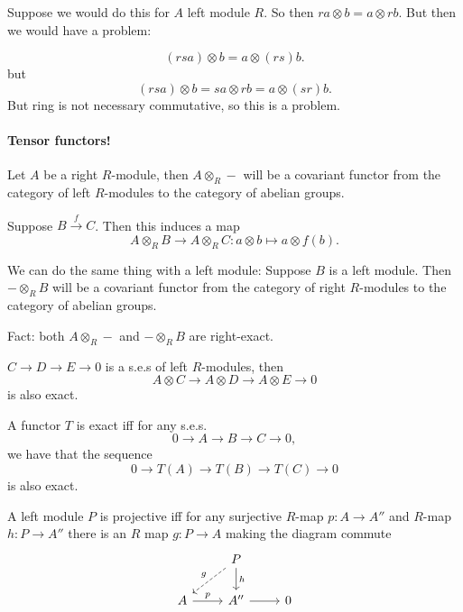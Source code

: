 Suppose we  would do this for $A$ left module $R$.
So then $ ra \otimes b = a \otimes rb .$ 
But then we would have a problem:

\[
    (r s a) \otimes b = a \otimes (rs)b
.\] 
but
\[
    (rsa) \otimes b = s a \otimes rb = a \otimes (sr) b
.\] 
But ring is not necessary commutative, so this is a problem.

\paragraph{Tensor functors!}

Let $A$ be a right $R$-module, then $A \otimes_R -$ will be a covariant functor from the category of left $R$-modules to the category of abelian groups.

Suppose $B \xrightarrow{f}  C$.
Then this induces a map 
\[
    A \otimes_R B \to  A \otimes_R C: a \otimes b \mapsto  a \otimes f(b)
.\] 

We can do the same thing with a left module:
Suppose $B$ is a left module.
Then $- \otimes_R B$ will be a covariant functor from the category of right $R$-modules to the category of abelian groups.

\begin{prop}
    Fact: both $A \otimes_R -$ and $- \otimes_R B$ are right-exact.
    \begin{eg}
        $C \to  D \to  E \to  0$ is a s.e.s of left $R$-modules, then
        \[
        A \otimes C \to  A\otimes D \to  A\otimes E \to  0
        \] 
        is also exact.
    \end{eg}
\end{prop}

\begin{definition}
    A functor $T$ is exact iff for any s.e.s.
    \[
        0 \to  A \to  B \to  C \to  0
    ,\]  we have that the sequence
    \[
        0 \to  T(A) \to  T(B) \to  T(C) \to  0
    \] 
    is also exact.
\end{definition}

\begin{definition}
    A left module $P$ is projective iff for any surjective $R$-map $p: A \to  A''$ and $R$-map $h: P \to  A''$ there is an $R$ map $g: P \to  A$ making the diagram commute
    \[
        \begin{tikzcd}
            & P \arrow[d, "h"] \arrow[dl, dashed, swap,"g"]\\
            A \arrow[r, "p"] & A'' \arrow[r, ""] & 0
        \end{tikzcd}
    \]
\end{definition}

